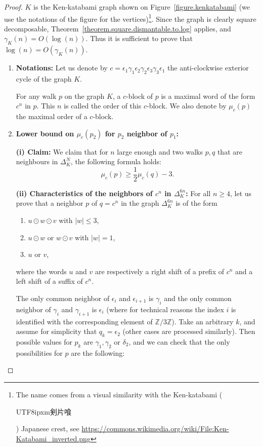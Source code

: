 \documentclass{article}
\begin{document}
\begin{proof}
$K$ is the Ken-katabami graph shown on Figure~\ref{figure.kenkatabami} (we
use the notations of the figure for the vertices)\footnote{The name comes from a visual similarity with the Ken-katabami (\begin{CJK}{UTF8}{ipxm}剣片喰\end{CJK}) Japanese crest, see \url{https://commons.wikimedia.org/wiki/File:Ken-Katabami_inverted.png}}. Since the graph is clearly square decomposable, Theorem~\ref{theorem.square.dismantable.to.log} applies, and $\gamma_K(n) = O(\log(n))$. Thus it is sufficient to prove that $\log(n) = O(\gamma_K(n))$.

\begin{enumerate}
\item \textbf{Notations:}
Let us denote by $c = \epsilon_1 \gamma_1 \epsilon_2 \gamma_2 \epsilon_3 \gamma_3 \epsilon_1$ the anti-clockwise exterior cycle of the graph $K$.

For any walk $p$ on the graph $K$, a $c$-block of $p$ is a maximal word of the form $c^n$ in $p$. This $n$ is called the order of this $c$-block. We also denote by $\mu_c(p)$ the maximal order of a $c$-block.

\item \textbf{Lower bound on $\mu_c (p_2)$ for $p_2$ neighbor of 
$p_1$:}

\textbf{(i) Claim:} We claim that for $n$ large enough and two walks $p, q$ that are neighbours in $\Delta_K^{N}$, the following formula holds: 
\[\mu_c(p) \ge\frac{1}{2} \mu_c(q) -3.\]

\textbf{(ii) Characteristics of the neighbors of $c^n$ in 
$\Delta_K^{6n}$:} For all $n \ge4$, let us prove that a neighbor $p$ of $q = c^n$ in the graph $\Delta_K^{6n}$ is of the form 
\begin{enumerate}
\item $u\odot w\odot v$ with $|w| \le 3$, 
\item $u\odot w$ or $w\odot v$ with $|w|=1$, 
\item $u$ or $v$,
\end{enumerate}
where the words $u$ and $v$ are respectively a right shift of a prefix of $c^n$ and a left shift of a suffix of $c^n$.

The only common neighbor of $\epsilon_i$ and $\epsilon_{i+1}$ is $\gamma_i$ and the only common neighbor of $\gamma_i$ and $\gamma_{i+1}$ is 
$\epsilon_i$ (where for technical reasons the index $i$ is identified with the corresponding element of $\mathbb{Z}/3\mathbb{Z}$). Take an arbitrary $k$, and assume for simplicity that $q_k= \epsilon_2$ (other cases are processed similarly). Then possible values for $p_k$ are $\gamma_1, \gamma_2$ or $\delta_2$, and we can check that the only possibilities for $p$ are the following:


\end{enumerate}
\end{proof}
\end{document}
